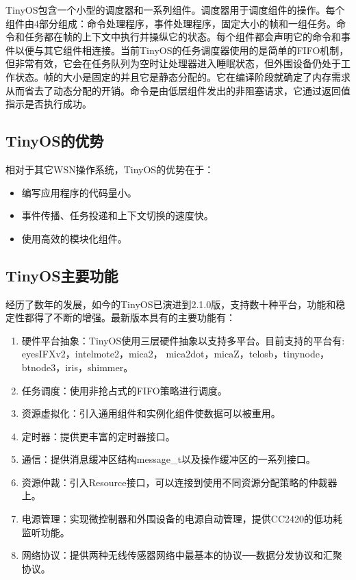TinyOS包含一个小型的调度器和一系列组件。调度器用于调度组件的操作。每个组件由4部分组成：命令处理程序，事件处理程序，固定大小的帧和一组任务。命令和任务都在帧的上下文中执行并操纵它的状态。每个组件都会声明它的命令和事件以便与其它组件相连接。当前TinyOS的任务调度器使用的是简单的FIFO机制，但非常有效，它会在任务队列为空时让处理器进入睡眠状态，但外围设备仍处于工作状态。帧的大小是固定的并且它是静态分配的。它在编译阶段就确定了内存需求从而省去了动态分配的开销。命令是由低层组件发出的非阻塞请求，它通过返回值指示是否执行成功。

\subsection{TinyOS的优势}
相对于其它WSN操作系统，TinyOS的优势在于：
\vspace{-10pt}
\begin{itemize}
	\item 编写应用程序的代码量小。
	\item 事件传播、任务投递和上下文切换的速度快。
	\item 使用高效的模块化组件。
\end{itemize}

\subsection{TinyOS主要功能}
经历了数年的发展，如今的TinyOS已演进到2.1.0版，支持数十种平台，功能和稳定性都得了不断的增强。最新版本具有的主要功能有：
\vspace{-10pt}
\begin{enumerate}
	\item {硬件平台抽象}：TinyOS使用三层硬件抽象以支持多平台。目前支持的平台有: eyesIFXv2，intelmote2，mica2， mica2dot，micaZ，telosb，tinynode，btnode3，iris，shimmer。
	\item {任务调度}：使用非抢占式的FIFO策略进行调度。
	\item {资源虚拟化}：引入通用组件和实例化组件使数据可以被重用。
	\item {定时器}：提供更丰富的定时器接口。
	\item {通信}：提供消息缓冲区结构message\_t以及操作缓冲区的一系列接口。
	\item {资源仲裁}：引入Resource接口，可以连接到使用不同资源分配策略的仲裁器上。
	\item {电源管理}：实现微控制器和外围设备的电源自动管理，提供CC2420的低功耗监听功能。
	\item {网络协议}：提供两种无线传感器网络中最基本的协议──数据分发协议和汇聚协议。
\end{enumerate}

